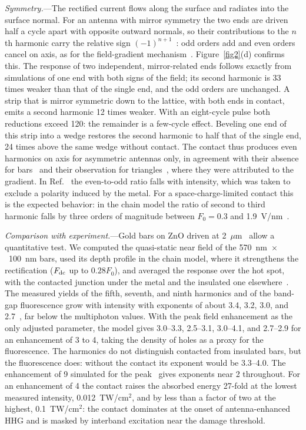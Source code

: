 \documentclass[aps,prl,twocolumn,superscriptaddress,floatfix,nolongbibliography]{revtex4-2}
\newcommand{\Fz}{F_0}
\begin{document}
\textit{Symmetry.}---The rectified current flows along the surface and radiates into the
surface normal. For an antenna with mirror symmetry the
two ends are driven half a cycle apart with opposite outward normals, so their contributions
to the $n$th harmonic carry the relative sign $(-1)^{n+1}$~\cite{SM}: odd orders add and even
orders cancel on axis, as for the field-gradient mechanism~\cite{vampa2017}.
Figure~\ref{fig2}(d) confirms this. The response of two independent, mirror-related ends
follows exactly from simulations of one end with both signs of the field; its second harmonic
is 33 times weaker than that of the single end, and the odd orders are unchanged. A strip that
is mirror symmetric down to the lattice, with both ends in contact, emits a second harmonic 12
times weaker. With an eight-cycle pulse both reductions exceed 120: the remainder is a few-cycle
effect. Beveling one end of this strip into a wedge restores the second harmonic to half that
of the single end, 24 times above the same wedge without contact. The contact thus produces even harmonics on axis for asymmetric
antennas only, in agreement with their absence for bars~\cite{vampa2017,imasaka2018} and their
observation for triangles~\cite{jalil2023}, where they were attributed to the gradient. In
Ref.~\cite{jalil2023} the even-to-odd ratio falls with intensity, which was taken to exclude a
polarity induced by the metal. For a space-charge-limited contact this is the expected
behavior: in the chain model the ratio of second to third harmonic falls by three orders of
magnitude between $\Fz=0.3$ and 1.9~V/nm~\cite{SM}. 

\textit{Comparison with experiment.}---Gold bars on ZnO driven at
2~$\mu$m~\cite{imasaka2018} allow a quantitative test. We computed the quasi-static near field
of the 570~nm~$\times$~100~nm bars, used its depth profile in the chain model, where it
strengthens the rectification ($F_{\rm dc}$ up to $0.28\Fz$), and averaged the response over
the hot spot, with the contacted junction under the metal and the insulated one
elsewhere~\cite{SM}. The measured yields of the fifth, seventh, and ninth harmonics and of the
band-gap fluorescence grow with intensity with exponents of about 3.4, 3.2, 3.0, and
2.7~\cite{imasaka2018,ashihara2020}, far below the multiphoton values. With the peak field
enhancement as the only adjusted parameter, the model gives 3.0--3.3, 2.5--3.1, 3.0--4.1, and
2.7--2.9 for an enhancement of 3 to 4, taking the density of holes as a proxy for the
fluorescence. The harmonics do not distinguish contacted from insulated bars, but the
fluorescence does: without the contact its exponent would be 3.3--4.0. The enhancement of 9
simulated for the peak~\cite{imasaka2019} gives exponents near 2 throughout. For an enhancement
of 4 the contact raises the absorbed energy 27-fold at the lowest measured intensity,
0.012~TW/cm$^2$, and by less than a factor of two at the highest, 0.1~TW/cm$^2$: the contact
dominates at the onset of antenna-enhanced HHG and is masked by interband excitation near the
damage threshold.
\end{document}
